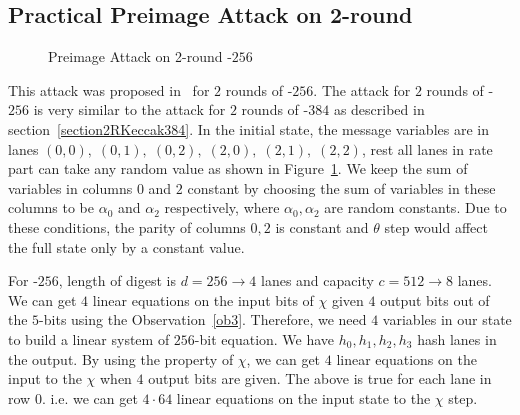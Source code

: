 \subsection{Practical Preimage Attack on 2-round }\label{section2RKeccak256}
    \begin{figure}
        \centering
        \caption{Preimage Attack on 2-round \KECCAK-$256$}
        \label{fig:2rkeccak256}
    \end{figure}

    This attack was proposed in~\cite{guo2016linear} for $2$ rounds of \KECCAK-$256$. The attack for $2$ rounds of \KECCAK-$256$ is very similar to the attack for $2$ rounds of \KECCAK-$384$ as described in section~\ref{section2RKeccak384}. In the initial state, the message variables are in lanes $(0, 0),\;(0, 1),\;(0, 2),\;(2, 0),\;(2, 1),\;(2, 2)$, rest all lanes in rate part can take any random value as shown in Figure~\ref{fig:2rkeccak256}. We keep the sum of variables in columns $0$ and $2$ constant by choosing the sum of variables in these columns to be $\alpha_0$ and $\alpha_2$ respectively, where $\alpha_0, \alpha_2$ are random constants. Due to these conditions, the parity of columns $0, 2$ is constant and $\theta$ step would affect the full state only by a constant value.
    
    For \KECCAK-$256$, length of digest is $d = 256 \rightarrow 4$ lanes and capacity $c = 512 \rightarrow 8$ lanes. We can get $4$ linear equations on the input bits of $\chi$ given $4$ output bits out of the $5$-bits using the Observation~\ref{ob3}. Therefore, we need $4$ variables in our state to build a linear system of $256$-bit equation. We have $h_0, h_1, h_2, h_3$  hash lanes in the output. By using the property of $\chi$, we can get $4$ linear equations on the input to the $\chi$ when $4$ output bits are given. The above is true for each lane in row $0$. i.e. we can get $4 \cdot 64$ linear equations on the input state to the $\chi$ step.
    
